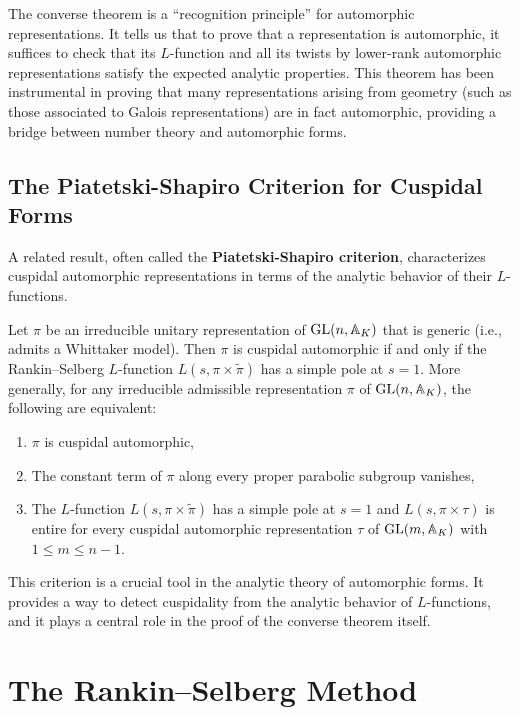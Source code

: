 The converse theorem is a ``recognition principle'' for automorphic representations. It tells us that to prove that a representation is automorphic, it suffices to check that its \(L\)-function and all its twists by lower-rank automorphic representations satisfy the expected analytic properties. This theorem has been instrumental in proving that many representations arising from geometry (such as those associated to Galois representations) are in fact automorphic, providing a bridge between number theory and automorphic forms.

\subsection{The Piatetski-Shapiro Criterion for Cuspidal Forms}

A related result, often called the \textbf{Piatetski-Shapiro criterion}, characterizes cuspidal automorphic representations in terms of the analytic behavior of their \(L\)-functions.

\begin{theorem}
Let \(\pi\) be an irreducible unitary representation of \(\operatorname{GL}(n,\mathbb{A}_K)\) that is generic (i.e., admits a Whittaker model). Then \(\pi\) is cuspidal automorphic if and only if the Rankin--Selberg \(L\)-function \(L(s, \pi \times \widetilde{\pi})\) has a simple pole at \(s = 1\). More generally, for any irreducible admissible representation \(\pi\) of \(\operatorname{GL}(n,\mathbb{A}_K)\), the following are equivalent:
\begin{enumerate}
    \item \(\pi\) is cuspidal automorphic,
    \item The constant term of \(\pi\) along every proper parabolic subgroup vanishes,
    \item The \(L\)-function \(L(s, \pi \times \widetilde{\pi})\) has a simple pole at \(s = 1\) and \(L(s, \pi \times \tau)\) is entire for every cuspidal automorphic representation \(\tau\) of \(\operatorname{GL}(m,\mathbb{A}_K)\) with \(1 \leq m \leq n-1\).
\end{enumerate}
\end{theorem}

This criterion is a crucial tool in the analytic theory of automorphic forms. It provides a way to detect cuspidality from the analytic behavior of \(L\)-functions, and it plays a central role in the proof of the converse theorem itself.

\section{The Rankin--Selberg Method}

